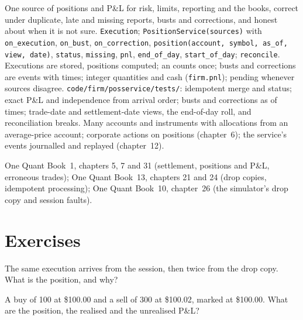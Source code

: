 \begin{build}
 One source of positions and P\&L for risk, limits, reporting and the books, correct under duplicate, late and missing
reports, busts and corrections, and honest about when it is not sure.
 \texttt{Execution}; \texttt{PositionService(sources)} with \texttt{on\_execution}, \texttt{on\_bust},
\texttt{on\_correction}, \texttt{position(account, symbol, as\_of, view, date)}, \texttt{status}, \texttt{missing}, \texttt{pnl},
\texttt{end\_of\_day}, \texttt{start\_of\_day}; \texttt{reconcile}.
 Executions are stored, positions computed; an  counts once; busts and corrections are events with times;
integer quantities and cash (\texttt{firm.pnl}); pending whenever sources disagree.
 \texttt{code/firm/posservice/tests/}: idempotent merge and status; exact P\&L and independence from arrival order;
busts and corrections as of times; trade-date and settlement-date views, the end-of-day roll, and reconciliation breaks.
 Many accounts and instruments with allocations from an average-price account; corporate actions on positions (chapter~6);
the service's events journalled and replayed (chapter~12).
\end{build}

\begin{omsources}
\item One Quant Book~1, chapters 5, 7 and 31 (settlement, positions and P\&L, erroneous trades); One Quant Book~13, chapters 21 and 24 (drop
copies, idempotent processing); One Quant Book~10, chapter~26 (the simulator's drop copy and session faults).
\end{omsources}

\section{Exercises}

\begin{exercise}[$\star$]\label{exo:pl:position-and-pnl-services:1}
The same execution arrives from the session, then twice from the drop copy. What is the position, and why?
\end{exercise}

\begin{exercise}[$\star$]\label{exo:pl:position-and-pnl-services:2}
A buy of 100 at \$100.00 and a sell of 300 at \$100.02, marked at \$100.00. What are the position, the realised and the unrealised P\&L?
\end{exercise}

